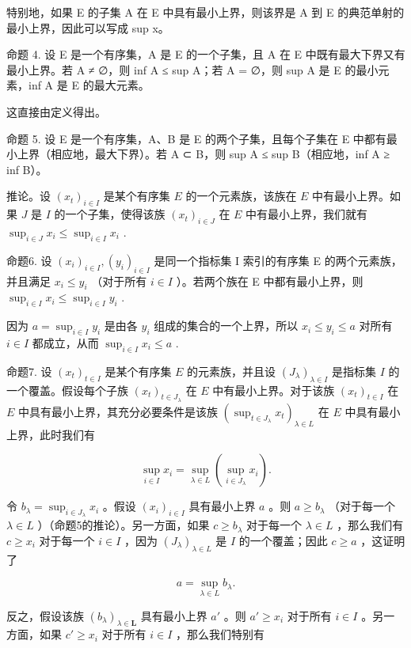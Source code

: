 特别地，如果 E 的子集 A 在 E 中具有最小上界，则该界是 A 到 E 的典范单射的最小上界，因此可以写成 sup x。

命题 4. 设 E 是一个有序集，A 是 E 的一个子集，且 A 在 E 中既有最大下界又有最小上界。若 A ≠ ∅，则 inf A ≤ sup A；若 A = ∅，则 sup A 是 E 的最小元素，inf A 是 E 的最大元素。

这直接由定义得出。

命题 5. 设 E 是一个有序集，A、B 是 E 的两个子集，且每个子集在 E 中都有最小上界（相应地，最大下界）。若 A ⊂ B，则 sup A ≤ sup B（相应地，inf A ≥ inf B）。

推论。设 \((x_{t})_{i\in I}\) 是某个有序集 \(E\) 的一个元素族，该族在 \(E\) 中有最小上界。如果 \(J\) 是 \(I\) 的一个子集，使得该族 \((x_{t})_{i\in J}\) 在 \(E\) 中有最小上界，我们就有 \(\sup_{i\in J}x_i\leqslant \sup_{i\in I}x_i\) .

命题6. 设 \((x_{i})_{i\in I}, (y_{i})_{i\in I}\) 是同一个指标集 I 索引的有序集 E 的两个元素族，并且满足 \(x_{i} \leqslant y_{i}\) （对于所有 \(i\in I\) ）。若两个族在 E 中都有最小上界，则 \(\sup_{i\in I} x_{i} \leqslant \sup_{i\in I} y_{i}\) .

因为 \(a = \sup_{i \in I} y_i\) 是由各 \(y_i\) 组成的集合的一个上界，所以 \(x_i \leqslant y_i \leqslant a\) 对所有 \(i \in I\) 都成立，从而 \(\sup_{i \in I} x_i \leqslant a\) .

命题7. 设 \((x_{t})_{t\in I}\) 是某个有序集 \(E\) 的元素族，并且设 \((J_{\lambda})_{\lambda \in I}\) 是指标集 \(I\) 的一个覆盖。假设每个子族 \((x_{t})_{t\in J_{\lambda}}\) 在 \(E\) 中有最小上界。对于该族 \((x_{t})_{t\in I}\) 在 \(E\) 中具有最小上界，其充分必要条件是该族 \(\left(\sup_{t\in J_{\lambda}}x_{t}\right)_{\lambda \in L}\) 在 \(E\) 中具有最小上界，此时我们有

\[
\sup _ {i \in I} x _ {i} = \sup _ {\lambda \in L} \left(\sup _ {i \in J _ {\lambda}} x _ {i}\right).\tag{1}
\]

令 \(b_{\lambda} = \sup_{i \in J_{\lambda}} x_i\) 。假设 \((x_i)_{i \in I}\) 具有最小上界 \(a\) 。则 \(a \geqslant b_{\lambda}\) （对于每一个 \(\lambda \in L\) ）（命题5的推论）。另一方面，如果 \(c \geqslant b_{\lambda}\) 对于每一个 \(\lambda \in L\) ，那么我们有 \(c \geqslant x_i\) 对于每一个 \(i \in I\) ，因为 \((J_{\lambda})_{\lambda \in L}\) 是 \(I\) 的一个覆盖；因此 \(c \geqslant a\) ，这证明了

\[
a = \sup _ {\lambda \in L} b _ {\lambda}.
\]

反之，假设该族 \((b_{\lambda})_{\lambda \in \mathbf{L}}\) 具有最小上界 \(a'\) 。则 \(a' \geqslant x_{i}\) 对于所有 \(i \in I\) 。另一方面，如果 \(c' \geqslant x_{i}\) 对于所有 \(i \in I\) ，那么我们特别有

